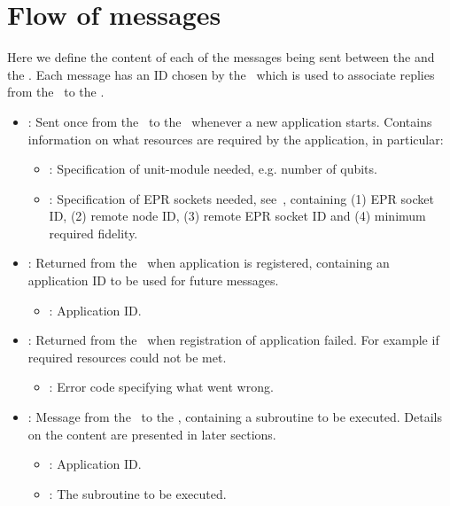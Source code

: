 \section{Flow of messages}
\label{sec:app-messages}
Here we define the content of each of the messages being sent between the \host and the \QNPU.
Each message has an ID chosen by the \host\ which is used to associate replies from the \QNPU\ to the \host.
\begin{itemize}
  \item {}:
        Sent once from the \host\ to the \QNPU\ whenever a new application starts.
        Contains information on what resources are required by the application, in particular:
        \begin{itemize}
            \item {}: Specification of unit-module needed, e.g. number of qubits.
            \item {}: Specification of EPR sockets needed, see~\cite{kozlowski2020networklayer}, containing
                (1) EPR socket ID,
                (2) remote node ID,
                (3) remote EPR socket ID and
                (4) minimum required fidelity.
        \end{itemize}
  \item {}:
            Returned from the \QNPU\ when application is registered, containing an application ID to be used for future messages.
            \begin{itemize}
                \item {}: Application ID.
            \end{itemize}
  \item {}:
        Returned from the \QNPU\ when registration of application failed.
        For example if required resources could not be met.
        \begin{itemize}
            \item {}: Error code specifying what went wrong.
        \end{itemize}
  \item {}:
        Message from the \host\ to the \QNPU, containing a subroutine to be executed.
        Details on the content are presented in later sections.
        \begin{itemize}
            \item {}: Application ID.
            \item {}: The subroutine to be executed.

\end{itemize}
\end{itemize}
